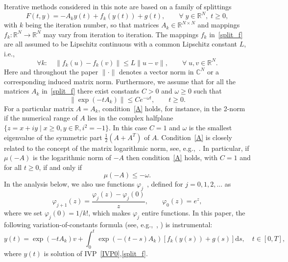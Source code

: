 \documentclass[sn-aps]{sn-jnl}
\theoremstyle{thmstyleone}%
\theoremstyle{thmstyletwo}%
\theoremstyle{thmstylethree}%
\newcommand{\Cc}{\mathbb{C}}
\newcommand{\dd}{\mathrm{d}}
\newcommand{\geqs}{\geqslant}
\newcommand{\leqs}{\leqslant}
\newcommand{\Rr}{\mathbb{R}}
\begin{document}
Iterative methods considered in this note are based on a family
of splittings
\begin{equation}
\label{split_f}
F(t,y) = -A_k y(t) + f_k(y(t)) + g(t), \qquad \forall\; y\in\Rr^N, \; t\geqs 0,
\end{equation}
with $k$ being the iteration number, so that matrices $A_k\in\Rr^{N\times N}$
and mappings $f_k:\Rr^N\rightarrow\Rr^N$
may vary from iteration to iteration.
The mappings $f_k$ in~\eqref{split_f} are all assumed to be Lipschitz continuous with 
a common Lipschitz constant $L$, i.e.,
\begin{equation}
\label{L}
\forall k:\quad
\|f_k(u) - f_k(v)\| \leqs L \|u-v\|, \qquad \forall\; u,v\in\Rr^N.
\end{equation}
Here and throughout the paper $\|\cdot\|$ denotes a vector norm in $\Cc^N$
or a corresponding induced matrix norm.
Furthermore, we assume that for all the matrices $A_k$ in~\eqref{split_f}
there exist constants $C>0$ and $\omega\geqs 0$ such that 
\begin{equation}
\label{A}
\|\exp(-tA_k)\|\leqs C e^{-\omega t}, \qquad t\geqs 0.
\end{equation}
For a particular matrix $A=A_k$, condition~\eqref{A} holds, for instance, in the 2-norm 
if the numerical range of $A$ lies in the complex halfplane 
$\{z=x+iy \;|\; x\geqs 0, y\in\Rr, i^2=-1\}$.
In this case $C=1$ and $\omega$ is the smallest eigenvalue
of the symmetric part $\frac12(A+A^T)$ of $A$.
Condition~\eqref{A} is closely related to the concept of the matrix
logarithmic norm, see, e.g.,~\cite{Dekker-Verwer:1984,HundsdorferVerwer:book}.
In particular, if $\mu(-A)$ is the logarithmic norm of $-A$ 
then
condition~\eqref{A} holds, with $C=1$ and for all $t\geqs 0$, 
if and only if \cite[Theorem~I.2.4]{HundsdorferVerwer:book} 
$$
\mu(-A)\leqs -\omega .
$$
In the analysis below, we also use functions 
$\varphi_j$~\cite[relation~(2.10)]{HochbruckOstermann2010}, 
defined for $j=0,1,2,\dots$ as
\begin{equation}
\label{phi}
\varphi_{j+1}(z)=\frac{\varphi_j(z)-\varphi_j(0)}{z},
\qquad \varphi_0(z)=e^z,  
\end{equation}
where we set $\varphi_j(0)=1/k!$, which makes $\varphi_j$ entire
functions.
In this paper, the following variation-of-constants formula (see,
e.g.,~\cite[Section~I.2.3]{HundsdorferVerwer:book},
\cite[relation~(1.5)]{HochbruckOstermann2010}) is instrumental:
\begin{equation}
\label{VOC}
y(t) = \exp(-tA_k)v + \int_0^t \exp(-(t-s)A_k)
\left[f_k(y(s)) + g(s) \right] \dd s,
\quad t\in[0,T],
\end{equation}
where $y(t)$ is solution of IVP~\eqref{IVP0},\eqref{split_f}.
\end{document}
